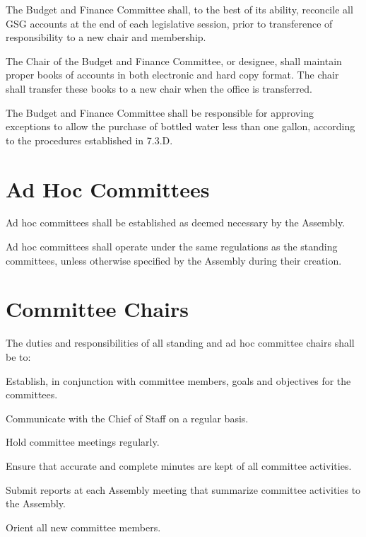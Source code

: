 \begin{bylaws-number}
  \begin{bylaws-number}
    \item The Budget and Finance Committee shall, to the best of its ability, reconcile all GSG accounts at the end of each legislative session, prior to transference of responsibility to a new chair and membership.
    \item The Chair of the Budget and Finance Committee, or designee, shall maintain proper books of accounts in both electronic and hard copy format. The chair shall transfer these books to a new chair when the office is transferred.
    \item The Budget and Finance Committee shall be responsible for approving exceptions to allow the purchase of bottled water less than one gallon, according to the procedures established in 7.3.D.
  \end{bylaws-number}
\end{bylaws-number}

\section{Ad Hoc Committees}
\begin{bylaws-number}
  \item Ad hoc committees shall be established as deemed necessary by the Assembly.
  \item Ad hoc committees shall operate under the same regulations as the standing committees, unless otherwise specified by the Assembly during their creation.
\end{bylaws-number}

\section{Committee Chairs}
The duties and responsibilities of all standing and ad hoc committee chairs shall be to:
\begin{bylaws-number}
  \item Establish, in conjunction with committee members, goals and objectives for the committees.
  \item Communicate with the Chief of Staff on a regular basis.
  \item Hold committee meetings regularly.
  \item Ensure that accurate and complete minutes are kept of all committee activities.
  \item Submit reports at each Assembly meeting that summarize committee activities to the Assembly.
  \item Orient all new committee members.
\end{bylaws-number}
